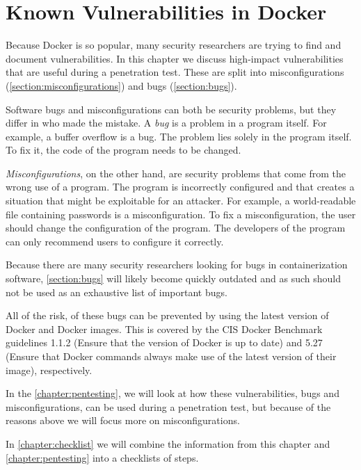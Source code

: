 \chapter{Known Vulnerabilities in Docker}\label{chapter:vulnerabilities}
Because Docker is so popular, many security researchers are trying to find and document vulnerabilities. In this chapter we discuss high-impact vulnerabilities that are useful during a penetration test. These are split into misconfigurations (\autoref{section:misconfigurations}) and bugs (\autoref{section:bugs}).

\medskip

Software bugs and misconfigurations can both be security problems, but they differ in who made the mistake. A \emph{bug} is a problem in a program itself. For example, a buffer overflow is a bug. The problem lies solely in the program itself. To fix it, the code of the program needs to be changed.

\emph{Misconfigurations}, on the other hand, are security problems that come from the wrong use of a program. The program is incorrectly configured and that creates a situation that might be exploitable for an attacker. For example, a world-readable file containing passwords is a misconfiguration. To fix a misconfiguration, the user should change the configuration of the program. The developers of the program can only recommend users to configure it correctly.

\medskip

Because there are many security researchers looking for bugs in containerization software, \autoref{section:bugs} will likely become quickly outdated and as such should not be used as an exhaustive list of important bugs.

All of the risk, of these bugs can be prevented by using the latest version of Docker and Docker images. This is covered by the CIS Docker Benchmark guidelines 1.1.2 (Ensure that the version of Docker is up to date) and 5.27 (Ensure that Docker commands always make use of the latest version of their image), respectively.

In the \autoref{chapter:pentesting}, we will look at how these vulnerabilities, bugs and misconfigurations, can be used during a penetration test, but because of the reasons above we will focus more on misconfigurations.

\medskip

In \autoref{chapter:checklist} we will combine the information from this chapter and \autoref{chapter:pentesting} into a checklists of steps.



